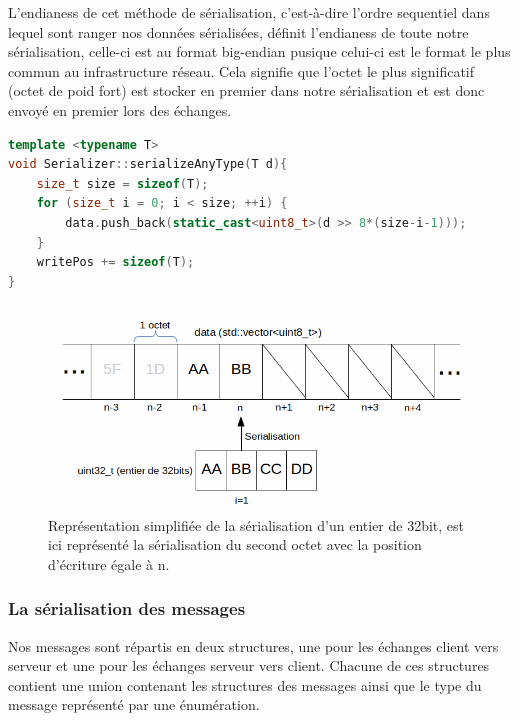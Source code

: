 \documentclass[a4paper, 12pt]{article}
\begin{document}
		
		L'endianess de cet méthode de sérialisation, c'est-à-dire l'ordre sequentiel dans lequel sont ranger nos données sérialisées, définit l'endianess de toute notre sérialisation, celle-ci est au format big-endian pusique celui-ci est le format le plus commun au infrastructure réseau. Cela signifie que l'octet le plus significatif (octet de poid fort) est stocker en premier dans notre sérialisation et est donc envoyé en premier lors des échanges.

\begin{lstlisting}[language=C++, caption=Méthode de sérailisation de type simple\, data est notre tableau dynamique\, d la varaible de type T à sérailiser et writePos la position d'écriture du sérialiseur]
template <typename T>
void Serializer::serializeAnyType(T d){
	size_t size = sizeof(T);
	for (size_t i = 0; i < size; ++i) {
		data.push_back(static_cast<uint8_t>(d >> 8*(size-i-1))); 
	}
	writePos += sizeof(T);
}\end{lstlisting}

\begin{figure}[bt]
	\centering
	\includegraphics[scale=0.35]{img/serialisation.png}
	\caption{Représentation simplifiée de la sérialisation d'un entier de 32bit, est ici représenté la sérialisation du second octet avec la position d'écriture égale à n.}
	\label{fig:serial}
\end{figure}

			\subsubsection{La sérialisation des messages}

			Nos messages sont répartis en deux structures, une pour les échanges client vers serveur et une pour les échanges serveur vers client. Chacune de ces structures contient une union contenant les structures des messages ainsi que le type du message représenté par une énumération.
\end{document}
